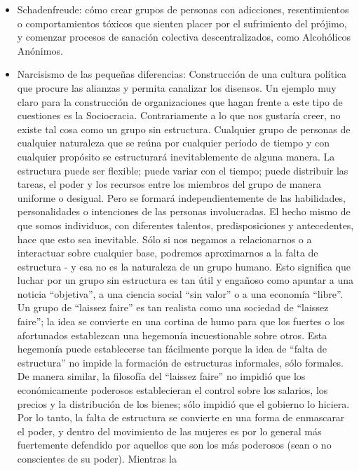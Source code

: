 \documentclass[
]{article}
\providecommand{\tightlist}{%
  \setlength{\itemsep}{0pt}\setlength{\parskip}{0pt}}
\begin{document}
\begin{itemize}
\tightlist
\item
  Schadenfreude: cómo crear grupos de personas con adicciones,
  resentimientos o comportamientos tóxicos que sienten placer por el
  sufrimiento del prójimo, y comenzar procesos de sanación colectiva
  descentralizados, como Alcohólicos Anónimos.
\item
  Narcisismo de las pequeñas diferencias: Construcción de una cultura
  política que procure las alianzas y permita canalizar los disensos. Un
  ejemplo muy claro para la construcción de organizaciones que hagan
  frente a este tipo de cuestiones es la Sociocracia. Contrariamente a
  lo que nos gustaría creer, no existe tal cosa como un grupo sin
  estructura. Cualquier grupo de personas de cualquier naturaleza que se
  reúna por cualquier período de tiempo y con cualquier propósito se
  estructurará inevitablemente de alguna manera. La estructura puede ser
  flexible; puede variar con el tiempo; puede distribuir las tareas, el
  poder y los recursos entre los miembros del grupo de manera uniforme o
  desigual. Pero se formará independientemente de las habilidades,
  personalidades o intenciones de las personas involucradas. El hecho
  mismo de que somos individuos, con diferentes talentos,
  predisposiciones y antecedentes, hace que esto sea inevitable. Sólo si
  nos negamos a relacionarnos o a interactuar sobre cualquier base,
  podremos aproximarnos a la falta de estructura - y esa no es la
  naturaleza de un grupo humano. Esto significa que luchar por un grupo
  sin estructura es tan útil y engañoso como apuntar a una noticia
  ``objetiva'', a una ciencia social ``sin valor'' o a una economía
  ``libre''. Un grupo de ``laissez faire'' es tan realista como una
  sociedad de ``laissez faire''; la idea se convierte en una cortina de
  humo para que los fuertes o los afortunados establezcan una hegemonía
  incuestionable sobre otros. Esta hegemonía puede establecerse tan
  fácilmente porque la idea de ``falta de estructura'' no impide la
  formación de estructuras informales, sólo formales. De manera similar,
  la filosofía del ``laissez faire'' no impidió que los económicamente
  poderosos establecieran el control sobre los salarios, los precios y
  la distribución de los bienes; sólo impidió que el gobierno lo
  hiciera. Por lo tanto, la falta de estructura se convierte en una
  forma de enmascarar el poder, y dentro del movimiento de las mujeres
  es por lo general más fuertemente defendido por aquellos que son los
  más poderosos (sean o no conscientes de su poder). Mientras la

\end{itemize}
\end{document}
